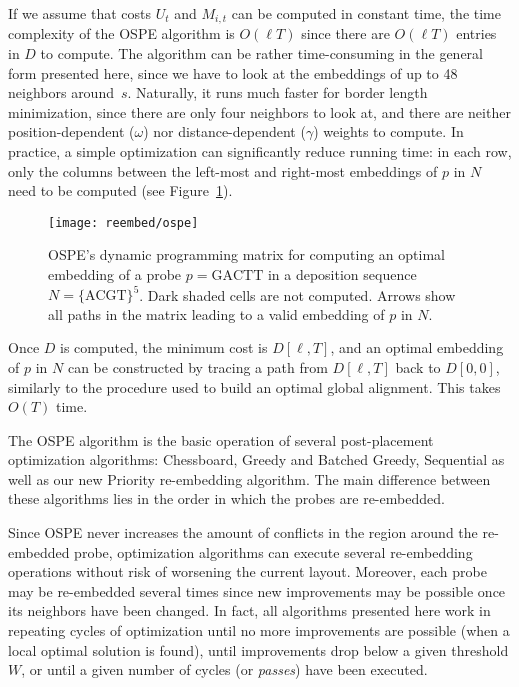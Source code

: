 If we assume that costs $U_t$ and $M_{i,t}$ can be computed in constant time,
the time complexity of the OSPE algorithm is $O(\ell T)$ since there are
$O(\ell T)$ entries in $D$ to compute. The algorithm can be rather
time-consuming in the general form presented here, since we have to look at the
embeddings of up to 48 neighbors around~$s$. Naturally, it runs much faster for
border length minimization, since there are only four neighbors to look at, and
there are neither position-dependent ($\omega$) nor distance-dependent
($\gamma$) weights to compute. In practice, a simple optimization can
significantly reduce running time: in each row, only the columns between the
left-most and right-most embeddings of $p$ in $N$ need to be computed (see
Figure~\ref{fig:ospe}).

\begin{figure}[t]\centering
\texttt{[image: reembed/ospe]}
\caption{\label{fig:ospe}%
  OSPE's dynamic programming matrix for computing an optimal embedding of a
  probe $p=\text{GACTT}$ in a deposition sequence $N=\text{\{ACGT\}}^5$. Dark
  shaded cells are not computed. Arrows show all paths in the matrix leading to
  a valid embedding of $p$ in $N$.}
\end{figure}

Once $D$ is computed, the minimum cost is $D[\ell,T]$, and an optimal embedding
of $p$ in $N$ can be constructed by tracing a path from $D[\ell,T]$ back to
$D[0,0]$, similarly to the procedure used to build an optimal global alignment.
This takes $O(T)$ time.

The OSPE algorithm is the basic operation of several post-placement optimization
algorithms: Chessboard, Greedy and Batched Greedy, Sequential as well as our new
Priority re-embedding algorithm. The main difference between these algorithms
lies in the order in which the probes are re-embedded.

Since OSPE never increases the amount of conflicts in the region around the
re-embedded probe, optimization algorithms can execute several re-embedding
operations without risk of worsening the current layout. Moreover, each probe
may be re-embedded several times since new improvements may be possible once its
neighbors have been changed. In fact, all algorithms presented here work in
repeating cycles of optimization until no more improvements are possible (when a
local optimal solution is found), until improvements drop below a given
threshold $W$, or until a given number of cycles (or \emph{passes}) have been
executed.

